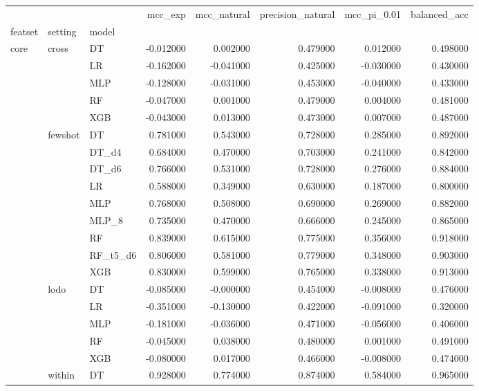 \begin{tabular}{lllrrrrr}
\toprule
 &  &  & mcc_exp & mcc_natural & precision_natural & mcc_pi_0.01 & balanced_acc \\
featset & setting & model &  &  &  &  &  \\
\midrule
\multirow[t]{24}{*}{core} & \multirow[t]{5}{*}{cross} & DT & -0.012000 & 0.002000 & 0.479000 & 0.012000 & 0.498000 \\
 &  & LR & -0.162000 & -0.041000 & 0.425000 & -0.030000 & 0.430000 \\
 &  & MLP & -0.128000 & -0.031000 & 0.453000 & -0.040000 & 0.433000 \\
 &  & RF & -0.047000 & 0.001000 & 0.479000 & 0.004000 & 0.481000 \\
 &  & XGB & -0.043000 & 0.013000 & 0.473000 & 0.007000 & 0.487000 \\
\cline{2-8}
 & \multirow[t]{9}{*}{fewshot} & DT & 0.781000 & 0.543000 & 0.728000 & 0.285000 & 0.892000 \\
 &  & DT_d4 & 0.684000 & 0.470000 & 0.703000 & 0.241000 & 0.842000 \\
 &  & DT_d6 & 0.766000 & 0.531000 & 0.728000 & 0.276000 & 0.884000 \\
 &  & LR & 0.588000 & 0.349000 & 0.630000 & 0.187000 & 0.800000 \\
 &  & MLP & 0.768000 & 0.508000 & 0.690000 & 0.269000 & 0.882000 \\
 &  & MLP_8 & 0.735000 & 0.470000 & 0.666000 & 0.245000 & 0.865000 \\
 &  & RF & 0.839000 & 0.615000 & 0.775000 & 0.356000 & 0.918000 \\
 &  & RF_t5_d6 & 0.806000 & 0.581000 & 0.779000 & 0.348000 & 0.903000 \\
 &  & XGB & 0.830000 & 0.599000 & 0.765000 & 0.338000 & 0.913000 \\
\cline{2-8}
 & \multirow[t]{5}{*}{lodo} & DT & -0.085000 & -0.000000 & 0.454000 & -0.008000 & 0.476000 \\
 &  & LR & -0.351000 & -0.130000 & 0.422000 & -0.091000 & 0.320000 \\
 &  & MLP & -0.181000 & -0.036000 & 0.471000 & -0.056000 & 0.406000 \\
 &  & RF & -0.045000 & 0.038000 & 0.480000 & 0.001000 & 0.491000 \\
 &  & XGB & -0.080000 & 0.017000 & 0.466000 & -0.008000 & 0.474000 \\
\cline{2-8}
 & \multirow[t]{5}{*}{within} & DT & 0.928000 & 0.774000 & 0.874000 & 0.584000 & 0.965000 \\

\end{tabular}
